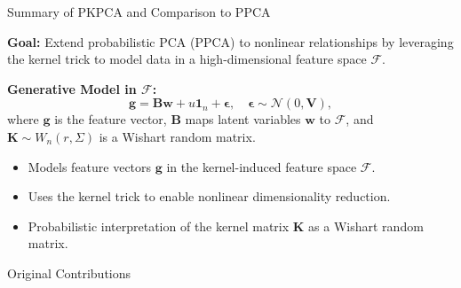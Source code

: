 \documentclass{beamer}
\begin{document}
\begin{frame}{Summary of PKPCA and Comparison to PPCA}

    \textbf{Goal:}
    Extend probabilistic PCA (PPCA) to nonlinear relationships by leveraging the kernel trick to model data in a high-dimensional feature space \( \mathcal{F} \).
    
    \vspace{1em}
    \textbf{Generative Model in \( \mathcal{F} \):}
    \[
        \mathbf{g} = \mathbf{B} \mathbf{w} + u \mathbf{1}_n + \boldsymbol{\epsilon}, \quad \boldsymbol{\epsilon} \sim \mathcal{N}(0, \mathbf{V}),
    \]
    where \( \mathbf{g} \) is the feature vector, \( \mathbf{B} \) maps latent variables \( \mathbf{w} \) to \( \mathcal{F} \), and \( \mathbf{K} \sim W_n(r, \Sigma) \) is a Wishart random matrix.
    
    \vspace{1em}

    \begin{itemize}
            \item Models feature vectors \( \mathbf{g} \) in the kernel-induced feature space \( \mathcal{F} \).
            \item Uses the kernel trick to enable nonlinear dimensionality reduction.
            \item Probabilistic interpretation of the kernel matrix \( \mathbf{K} \) as a Wishart random matrix.
    \end{itemize}
    

    \end{frame}

\begin{frame}{Original Contributions}

\end{frame}
\end{document}
